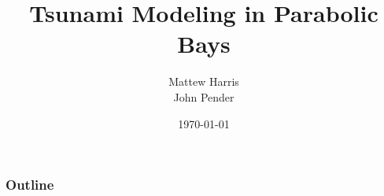 \documentclass[xcolor=dvipsnames]{beamer}
\title[Tsunami Modeling]{Tsunami Modeling in Parabolic Bays}
\author{Mattew Harris \\ John Pender}
\date{\today}
\institute{University of Alaska Fairbanks}
\newcommand{\slide}[2][]{\begin{frame}\frametitle{#1}#2\end{frame}}
\begin{document}
	\begin{frame}
		\titlepage
	\end{frame}
	
	\slide[Outline]{\tableofcontents}

	
	
	
	
	
\end{document}
